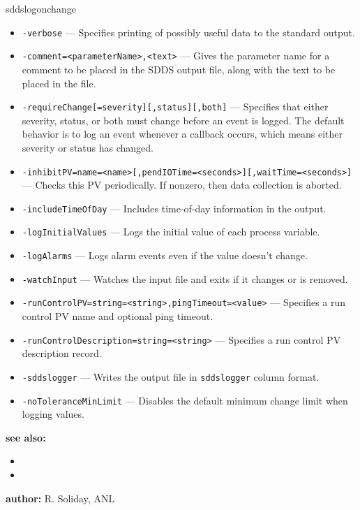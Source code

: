 \begin{sddsprog}{sddslogonchange}
\begin{itemize}
        \item {\tt -verbose} --- Specifies printing of possibly useful data to the standard output.
        \item {\tt -comment=<parameterName>,<text>} --- Gives the parameter name for a comment to be placed in the SDDS output file, along with the text to be placed in the file.
        \item {\tt -requireChange[=severity][,status][,both]} --- Specifies that either severity, status, or both must change before an event is logged.  The default behavior is to log an event whenever a callback occurs, which means either severity or status has changed.
        \item {\tt -inhibitPV=name=<name>[,pendIOTime=<seconds>][,waitTime=<seconds>]} --- Checks this PV periodically.  If nonzero, then data collection is aborted.
        \item {\tt -includeTimeOfDay} --- Includes time-of-day information in the output.
        \item {\tt -logInitialValues} --- Logs the initial value of each process variable.
        \item {\tt -logAlarms} --- Logs alarm events even if the value doesn't change.
        \item {\tt -watchInput} --- Watches the input file and exits if it changes or is removed.
        \item {\tt -runControlPV=string=<string>,pingTimeout=<value>} --- Specifies a run control PV name and optional ping timeout.
        \item {\tt -runControlDescription=string=<string>} --- Specifies a run control PV description record.
        \item {\tt -sddslogger} --- Writes the output file in \verb+sddslogger+ column format.
        \item {\tt -noToleranceMinLimit} --- Disables the default minimum change limit when logging values.
    \end{itemize}

\item \textbf{see also:}
    \begin{itemize}
    \item {}
    \item {}
    \end{itemize}
\item \textbf{author:} R. Soliday, ANL 
\end{sddsprog}
